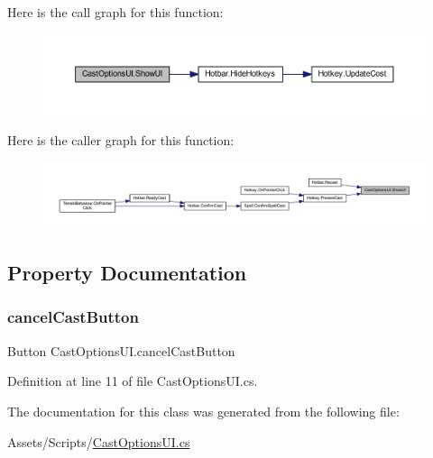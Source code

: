 Here is the call graph for this function\+:
\nopagebreak
\begin{figure}[H]
\begin{center}
\leavevmode
\includegraphics[width=350pt]{class_cast_options_u_i_a37c4fa85c666ede5418cd5d7e524ce35_cgraph}
\end{center}
\end{figure}
Here is the caller graph for this function\+:
\nopagebreak
\begin{figure}[H]
\begin{center}
\leavevmode
\includegraphics[width=350pt]{class_cast_options_u_i_a37c4fa85c666ede5418cd5d7e524ce35_icgraph}
\end{center}
\end{figure}


\subsection{Property Documentation}
\mbox{\label{class_cast_options_u_i_a88e0c5e435183c0f3912bd9eb5a6629f}} 
\subsubsection{\texorpdfstring{cancelCastButton}{cancelCastButton}}
{\footnotesize\ttfamily Button Cast\+Options\+U\+I.\+cancel\+Cast\+Button\hspace{0.3cm}{\ttfamily [get]}}



Definition at line 11 of file Cast\+Options\+U\+I.\+cs.



The documentation for this class was generated from the following file\+:\begin{DoxyCompactItemize}
\item 
Assets/\+Scripts/\mbox{\hyperlink{_cast_options_u_i_8cs}{Cast\+Options\+U\+I.\+cs}}\end{DoxyCompactItemize}
